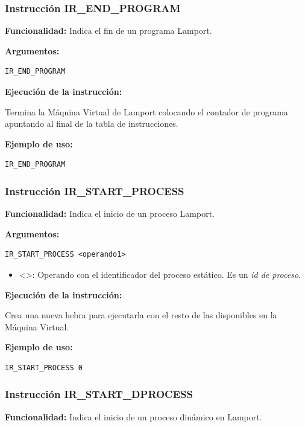 \subsubsection{Instrucción IR\_END\_PROGRAM}\label{subsubsec:IR_END_PROGRAM}
\noindent
\textbf{Funcionalidad:} Indica el fin de un programa Lamport.

\noindent
\textbf{Argumentos:}
\begin{verbatim}
IR_END_PROGRAM
\end{verbatim}

\noindent
\textbf{Ejecución de la instrucción:}
\vspace{0.3cm}

\noindent
Termina la Máquina Virtual de Lamport colocando el contador de programa apuntando al final de la tabla de instrucciones.
\vspace{0.3cm}

\noindent
\textbf{Ejemplo de uso:}
\begin{verbatim}
IR_END_PROGRAM
\end{verbatim}

\subsubsection{Instrucción IR\_START\_PROCESS}\label{subsubsec:IR_START_PROCESS}
\noindent
\textbf{Funcionalidad:} Indica el inicio de un proceso Lamport.

\noindent
\textbf{Argumentos:}
\begin{verbatim}
IR_START_PROCESS <operando1>
\end{verbatim}
\begin{itemize}
    \item <>: Operando con el identificador del proceso estático. Es un \textit{id de proceso}.
\end{itemize}

\noindent
\textbf{Ejecución de la instrucción:}
\vspace{0.3cm}

\noindent
Crea una nueva hebra para ejecutarla con el resto de las disponibles en la Máquina Virtual.
\vspace{0.3cm}

\noindent
\textbf{Ejemplo de uso:}
\begin{verbatim}
IR_START_PROCESS 0
\end{verbatim}

\subsubsection{Instrucción IR\_START\_DPROCESS}\label{subsubsec:IR_START_DPROCESS}
\noindent
\textbf{Funcionalidad:} Indica el inicio de un proceso dinámico en Lamport.

